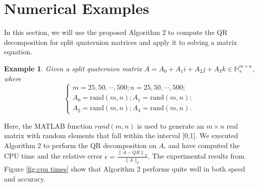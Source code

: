 \documentclass[preprint,12pt]{elsarticle}
\newtheorem{example}[theorem]{Example}
\numberwithin{equation}{section}
\begin{document}
\section{Numerical Examples}
In this section,  we will use the proposed  Algorithm 2 to compute the QR decomposition for split quaternion matrices and apply it to solving a matrix equation.
\begin{example}
    Given a split quaternion matrix $A = A_{0}+A_{1}i+A_{2}j+A_{3}k\in \mathbb{H}_s^{m\times n}$, where
    \begin{equation}
       \begin{cases}
            m = 25,50,\cdots,500;
            n = 25,50,\cdots,500;  \\
            A_{0}=\text{rand}(m,n);
            A_{1}=\text{rand}(m,n); \\
            A_{2}=\text{rand}(m,n);
            A_{3}=\text{rand}(m,n).
        \end{cases} \label{eq:example2}
    \end{equation}
\end{example}
Here, the MATLAB function  $rand(m,n)$ is used to generate an $m \times n$ real matrix with random elements that fall within the interval [0,1]. We executed Algorithm 2 to perform the QR decomposition on $A$, and have computed the CPU time and the relative error
$\epsilon = \frac{\left\|A - Q R\right\|_{F}}{\|A\|_{F}}.$
The experimental results from Figure \ref{fig:cpu times} show that Algorithm 2 performs quite well in both speed and accuracy. 
\end{document}
